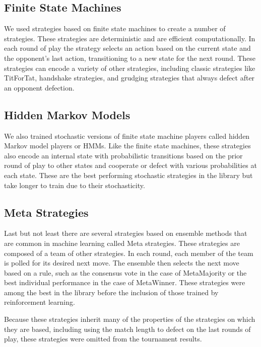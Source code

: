 \documentclass{article}
\begin{document}
\subsection{Finite State Machines}

We used strategies based on finite state machines to create a number of
strategies. These strategies are deterministic and are efficient computationally.
In each round of play the strategy selects an action based on the current state
and the opponent's last action, transitioning to a new state for the next round.
These strategies can encode a variety
of other strategies, including classic strategies like TitForTat, 
handshake strategies, and grudging strategies that always defect after
an opponent defection.


\subsection{Hidden Markov Models}

We also trained stochastic versions of finite state machine players called
hidden Markov model players or HMMs. Like the finite state machines, these
strategies also encode an internal
state with probabilistic transitions based on the prior round of play to other
states and cooperate or defect with various probabilities at each state. These
are the best performing stochastic strategies in the library but take longer
to train due to their stochasticity.

\subsection{Meta Strategies}

Last but not least there are several strategies based on ensemble methods that
are common in machine learning called Meta strategies. These strategies are
composed of a team of other strategies. In each round, each member of the team
is polled for its desired next
move. The ensemble then selects the next move based on a rule, such as the
consensus vote in the case of MetaMajority or the best individual performance
in the case of MetaWinner. These strategies were among the best in the library
before the inclusion of those trained by reinforcement learning.

Because these strategies inherit many of the properties of the strategies
on which they are based, including using the match length to defect on the last
rounds of play, these strategies were omitted from the tournament results.
\end{document}
